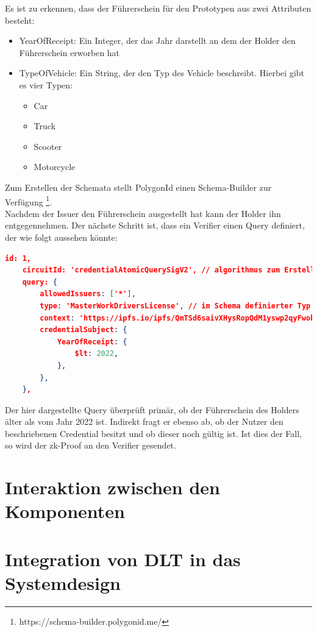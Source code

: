 Es ist zu erkennen, dass der Führerschein für den Prototypen aus zwei Attributen besteht:
\begin{itemize}
	\item YearOfReceipt: Ein Integer, der das Jahr darstellt an dem der Holder den Führerschein erworben hat
	\item TypeOfVehicle: Ein String, der den Typ des Vehicle beschreibt. Hierbei gibt es vier Typen: 
	
	\begin{itemize}
		\item Car
		\item Truck
		\item Scooter
		\item Motorcycle
	\end{itemize}
\end{itemize}

Zum Erstellen der Schemata stellt PolygonId einen Schema-Builder zur Verfügung \footnote{https://schema-builder.polygonid.me/}. \\
Nachdem der Issuer den Führerschein ausgestellt hat kann der Holder ihn entgegennehmen. Der nächste Schritt ist, dass ein Verifier einen Query definiert, der wie folgt aussehen könnte:
\begin{lstlisting}[language=json,firstnumber=1]	
	id: 1,
	circuitId: 'credentialAtomicQuerySigV2', // algorithmus zum Erstellen des zk-Proofs
	query: {
		allowedIssuers: ['*'],
		type: 'MasterWorkDriversLicense', // im Schema definierter Typ
		context: 'https://ipfs.io/ipfs/QmTSd6saivXHysRopQdM1yswp2qyFwobL7fwuFpkVTS8gd',
		credentialSubject: {
			YearOfReceipt: {
				$lt: 2022,
			},
		},
	},
\end{lstlisting}
Der hier dargestellte Query überprüft primär, ob der Führerschein des Holders älter als vom Jahr 2022 ist. Indirekt fragt er ebenso ab, ob der Nutzer den beschriebenen Credential besitzt und ob dieser noch gültig ist. Ist dies der Fall, so wird der zk-Proof an den Verifier gesendet.
\section{Interaktion zwischen den Komponenten}
\blindtext

\section{Integration von DLT in das Systemdesign}
\blindtext
